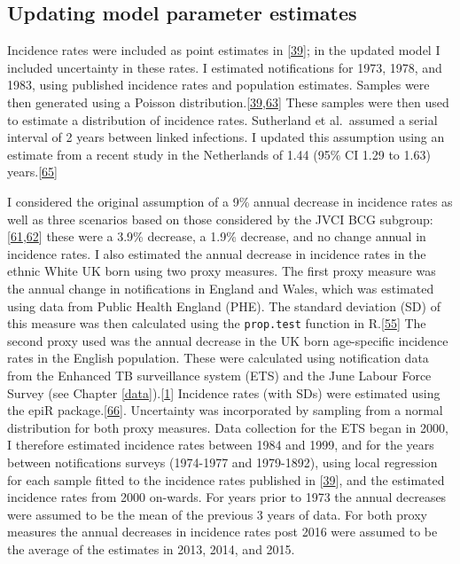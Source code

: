 \documentclass[11pt,twoside]{bristolthesis}
\begin{document}
  \hypertarget{updating-model-parameter-estimates}{%
  \subsection{Updating model parameter estimates}\label{updating-model-parameter-estimates}}
  
  Incidence rates were included as point estimates in {[}\protect\hyperlink{ref-Sutherland1989}{39}{]}; in the updated model I included uncertainty in these rates. I estimated notifications for 1973, 1978, and 1983, using published incidence rates and population estimates. Samples were then generated using a Poisson distribution.{[}\protect\hyperlink{ref-Sutherland1989}{39},\protect\hyperlink{ref-Sutherland1987a}{63}{]} These samples were then used to estimate a distribution of incidence rates. Sutherland et al.~assumed a serial interval of 2 years between linked infections. I updated this assumption using an estimate from a recent study in the Netherlands of 1.44 (95\% CI 1.29 to 1.63) years.{[}\protect\hyperlink{ref-Borgdorff2011}{65}{]}
  
  I considered the original assumption of a 9\% annual decrease in incidence rates as well as three scenarios based on those considered by the JVCI BCG subgroup:{[}\protect\hyperlink{ref-JVCIBCG2002}{61},\protect\hyperlink{ref-JVCIBCG2003}{62}{]} these were a 3.9\% decrease, a 1.9\% decrease, and no change annual in incidence rates. I also estimated the annual decrease in incidence rates in the ethnic White UK born using two proxy measures. The first proxy measure was the annual change in notifications in England and Wales, which was estimated using data from Public Health England (PHE). The standard deviation (SD) of this measure was then calculated using the \texttt{prop.test} function in R.{[}\protect\hyperlink{ref-R}{55}{]} The second proxy used was the annual decrease in the UK born age-specific incidence rates in the English population. These were calculated using notification data from the Enhanced TB surveillance system (ETS) and the June Labour Force Survey (see Chapter \ref{data}).{[}\protect\hyperlink{ref-PHE2017}{1}{]} Incidence rates (with SDs) were estimated using the epiR package.{[}\protect\hyperlink{ref-EpiR}{66}{]}. Uncertainty was incorporated by sampling from a normal distribution for both proxy measures. Data collection for the ETS began in 2000, I therefore estimated incidence rates between 1984 and 1999, and for the years between notifications surveys (1974-1977 and 1979-1892), using local regression for each sample fitted to the incidence rates published in {[}\protect\hyperlink{ref-Sutherland1989}{39}{]}, and the estimated incidence rates from 2000 on-wards. For years prior to 1973 the annual decreases were assumed to be the mean of the previous 3 years of data. For both proxy measures the annual decreases in incidence rates post 2016 were assumed to be the average of the estimates in 2013, 2014, and 2015.
  
\end{document}
